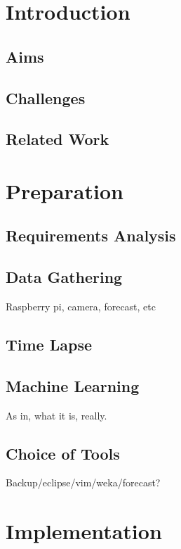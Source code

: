 \documentclass[14]{report}
\begin{document}
\tableofcontents

\listoffigures

\chapter{Introduction}

\section{Aims}

\section{Challenges}

\section{Related Work} %

\chapter{Preparation}

\section{Requirements Analysis}


\section{Data Gathering}
Raspberry pi, camera, forecast, etc

\section{Time Lapse}

\section{Machine Learning}
As in, what it is, really.

\section{Choice of Tools}
Backup/eclipse/vim/weka/forecast?

\chapter{Implementation}
\end{document}
